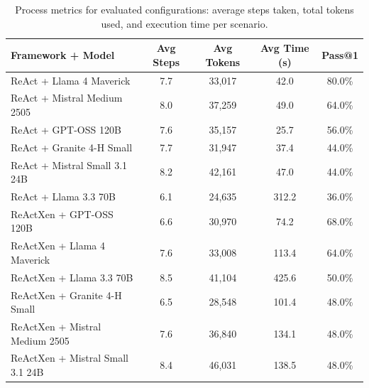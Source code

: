 \begin{table}[t]
\caption{Process metrics for evaluated configurations: average steps taken, total tokens used, and execution time per scenario.}
\label{tab:process_metrics}
\centering\small
\begin{tabular}{lcccc}
\toprule
\textbf{Framework + Model} & \textbf{Avg Steps} & \textbf{Avg Tokens} & \textbf{Avg Time (s)} & \textbf{Pass@1} \\
\midrule
ReAct + Llama 4 Maverick & 7.7 & 33,017 & 42.0 & 80.0\% \\
ReAct + Mistral Medium 2505 & 8.0 & 37,259 & 49.0 & 64.0\% \\
ReAct + GPT-OSS 120B & 7.6 & 35,157 & 25.7 & 56.0\% \\
ReAct + Granite 4-H Small & 7.7 & 31,947 & 37.4 & 44.0\% \\
ReAct + Mistral Small 3.1 24B & 8.2 & 42,161 & 47.0 & 44.0\% \\
ReAct + Llama 3.3 70B & 6.1 & 24,635 & 312.2 & 36.0\% \\
ReActXen + GPT-OSS 120B & 6.6 & 30,970 & 74.2 & 68.0\% \\
ReActXen + Llama 4 Maverick & 7.6 & 33,008 & 113.4 & 64.0\% \\
ReActXen + Llama 3.3 70B & 8.5 & 41,104 & 425.6 & 50.0\% \\
ReActXen + Granite 4-H Small & 6.5 & 28,548 & 101.4 & 48.0\% \\
ReActXen + Mistral Medium 2505 & 7.6 & 36,840 & 134.1 & 48.0\% \\
ReActXen + Mistral Small 3.1 24B & 8.4 & 46,031 & 138.5 & 48.0\% \\
\bottomrule
\end{tabular}
\end{table}